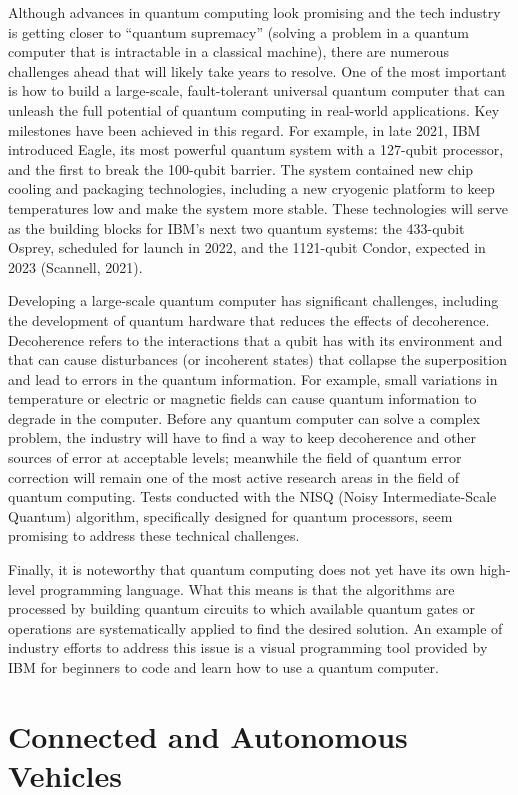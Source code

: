 \documentclass[
  letterpaper,
  DIV=11,
  numbers=noendperiod]{scrreprt}
\begin{document}
Although advances in quantum computing look promising and the tech
industry is getting closer to ``quantum supremacy'' (solving a problem
in a quantum computer that is intractable in a classical machine), there
are numerous challenges ahead that will likely take years to resolve.
One of the most important is how to build a large-scale, fault-tolerant
universal quantum computer that can unleash the full potential of
quantum computing in real-world applications. Key milestones have been
achieved in this regard. For example, in late 2021, IBM introduced
Eagle, its most powerful quantum system with a 127-qubit processor, and
the first to break the 100-qubit barrier. The system contained new chip
cooling and packaging technologies, including a new cryogenic platform
to keep temperatures low and make the system more stable. These
technologies will serve as the building blocks for IBM's next two
quantum systems: the 433-qubit Osprey, scheduled for launch in 2022, and
the 1121-qubit Condor, expected in 2023 (Scannell, 2021).

Developing a large-scale quantum computer has significant challenges,
including the development of quantum hardware that reduces the effects
of decoherence. Decoherence refers to the interactions that a qubit has
with its environment and that can cause disturbances (or incoherent
states) that collapse the superposition and lead to errors in the
quantum information. For example, small variations in temperature or
electric or magnetic fields can cause quantum information to degrade in
the computer. Before any quantum computer can solve a complex problem,
the industry will have to find a way to keep decoherence and other
sources of error at acceptable levels; meanwhile the field of quantum
error correction will remain one of the most active research areas in
the field of quantum computing. Tests conducted with the NISQ (Noisy
Intermediate-Scale Quantum) algorithm, specifically designed for quantum
processors, seem promising to address these technical challenges.

Finally, it is noteworthy that quantum computing does not yet have its
own high-level programming language. What this means is that the
algorithms are processed by building quantum circuits to which available
quantum gates or operations are systematically applied to find the
desired solution. An example of industry efforts to address this issue
is a visual programming tool provided by IBM for beginners to code and
learn how to use a quantum computer.

\hypertarget{connected-and-autonomous-vehicles}{%
\section{Connected and Autonomous
Vehicles}\label{connected-and-autonomous-vehicles}}
\end{document}
